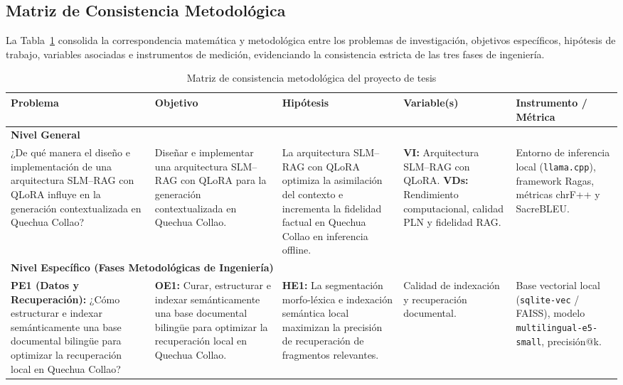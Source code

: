 \subsection{Matriz de Consistencia Metodológica}
La Tabla~\ref{tab:matriz_consistencia} consolida la correspondencia matemática y metodológica entre los problemas de investigación, objetivos específicos, hipótesis de trabajo, variables asociadas e instrumentos de medición, evidenciando la consistencia estricta de las tres fases de ingeniería.

\begin{table}[H]
\centering
\caption{Matriz de consistencia metodológica del proyecto de tesis}
\label{tab:matriz_consistencia}
\scriptsize
\begin{tabularx}{\textwidth}{@{}p{2.8cm}p{3.0cm}p{3.0cm}p{2.4cm}X@{}}
\toprule
\rowcolor{tcAzul!12}
\textbf{Problema} & \textbf{Objetivo} & \textbf{Hipótesis} & \textbf{Variable(s)} & \textbf{Instrumento / Métrica} \\
\midrule
\multicolumn{5}{l}{\textbf{Nivel General}} \\
¿De qué manera el diseño e implementación de una arquitectura SLM--RAG con QLoRA influye en la generación contextualizada en Quechua Collao? & 
Diseñar e implementar una arquitectura SLM--RAG con QLoRA para la generación contextualizada en Quechua Collao. & 
La arquitectura SLM--RAG con QLoRA optimiza la asimilación del contexto e incrementa la fidelidad factual en Quechua Collao en inferencia offline. & 
\textbf{VI:} Arquitectura SLM--RAG con QLoRA.\newline
\textbf{VDs:} Rendimiento computacional, calidad PLN y fidelidad RAG. & 
Entorno de inferencia local (\texttt{llama.cpp}), framework Ragas, métricas chrF++ y SacreBLEU. \\
\midrule
\multicolumn{5}{l}{\textbf{Nivel Específico (Fases Metodológicas de Ingeniería)}} \\
\textbf{PE1 (Datos y Recuperación):} ¿Cómo estructurar e indexar semánticamente una base documental bilingüe para optimizar la recuperación local en Quechua Collao? & 
\textbf{OE1:} Curar, estructurar e indexar semánticamente una base documental bilingüe para optimizar la recuperación local en Quechua Collao. & 
\textbf{HE1:} La segmentación morfo-léxica e indexación semántica local maximizan la precisión de recuperación de fragmentos relevantes. & 
Calidad de indexación y recuperación documental. & 
Base vectorial local (\texttt{sqlite-vec} / FAISS), modelo \texttt{multilingual-e5-small}, precisión@k. \\

\end{tabularx}
\end{table}
